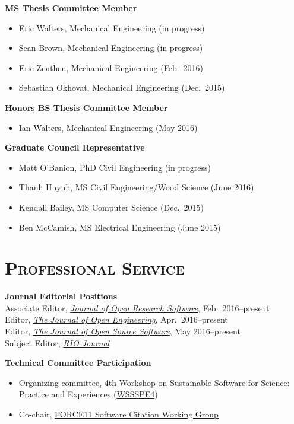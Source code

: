 \documentclass[margin,line,11pt]{res}
\begin{document}
\begin{resume}

\textbf{MS Thesis Committee Member}
\begin{itemize}[leftmargin=*]
\item Eric Walters, Mechanical Engineering (in progress)
\item Sean Brown, Mechanical Engineering (in progress)
\item Eric Zeuthen, Mechanical Engineering (Feb.\ 2016)
\item Sebastian Okhovat, Mechanical Engineering (Dec.\ 2015)
\end{itemize}

\textbf{Honors BS Thesis Committee Member}
\begin{itemize}[leftmargin=*]
\item Ian Walters, Mechanical Engineering (May 2016)
\end{itemize}

\textbf{Graduate Council Representative}
\begin{itemize}[leftmargin=*]
\item Matt O'Banion, PhD Civil Engineering (in progress)
\item Thanh Huynh, MS Civil Engineering\slash Wood Science (June 2016)
\item Kendall Bailey, MS Computer Science (Dec.\ 2015)
\item Ben McCamish, MS Electrical Engineering (June 2015)
\end{itemize}

\section{\textsc{Professional Service}}

\textbf{Journal Editorial Positions} \\
Associate Editor, \href{http://openresearchsoftware.metajnl.com}{\emph{Journal of Open Research Software}}, Feb.\ 2016--present \\
Editor, \href{http://www.tjoe.org}{\emph{The Journal of Open Engineering}}, Apr.\ 2016--present \\
Editor, \href{http://joss.theoj.org}{\emph{The Journal of Open Source Software}}, May 2016--present \\
Subject Editor, \href{http://riojournal.com}{\emph{RIO Journal}}

\textbf{Technical Committee Participation}
\begin{itemize}[leftmargin=*]
\item Organizing committee, 4th Workshop on Sustainable Software for Science: Practice and Experiences (\href{http://wssspe.researchcomputing.org.uk/wssspe4/}{WSSSPE4})
\item Co-chair, \href{https://www.force11.org/group/software-citation-working-group}{FORCE11 Software Citation Working Group}
\end{itemize}


\end{resume}
\end{document}
